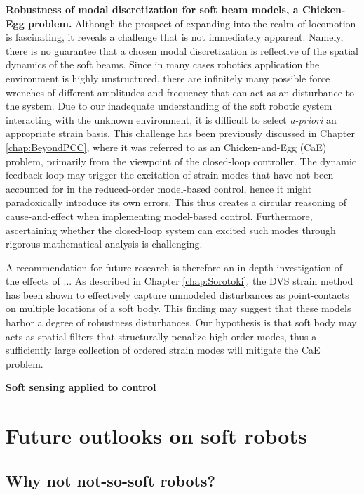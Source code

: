 \textbf{Robustness of modal discretization for soft beam models, a Chicken-Egg problem.} Although the prospect of expanding into the realm of locomotion is fascinating, it reveals a challenge that is not immediately apparent. Namely, there is no guarantee that a chosen modal discretization is reflective of the spatial dynamics of the soft beams. Since in many cases robotics application the environment is highly unstructured, there are infinitely many possible force wrenches of different amplitudes and frequency that can act as an disturbance to the system. Due to our inadequate understanding of the soft robotic system interacting with the unknown environment, it is difficult to select \textit{a-priori} an appropriate strain basis. This challenge has been previously discussed in Chapter \ref{chap:BeyondPCC}, where it was referred to as an Chicken-and-Egg (CaE) problem, primarily from the viewpoint of the closed-loop controller. The dynamic feedback loop may trigger the excitation of strain modes that have not been accounted for in the reduced-order model-based control, hence it might paradoxically introduce its own errors. This thus creates a circular reasoning of cause-and-effect when implementing model-based control. Furthermore, ascertaining whether the closed-loop system can excited such modes through rigorous mathematical analysis is challenging.

A recommendation for future research is therefore an in-depth investigation of the effects of ... As described in Chapter \ref{chap:Sorotoki}, the DVS strain method has been shown to effectively capture unmodeled disturbances as point-contacts on multiple locations of a soft body. This finding may suggest that these models harbor a degree of robustness disturbances. Our hypothesis is that soft body may acts as spatial filters that structurally penalize high-order modes, thus a sufficiently large collection of ordered strain modes will mitigate the CaE problem.  

\noindent \textbf{Soft sensing applied to control}

\newpage
\section{Future outlooks on soft robots}

\subsection*{Why not not-so-soft robots?}

